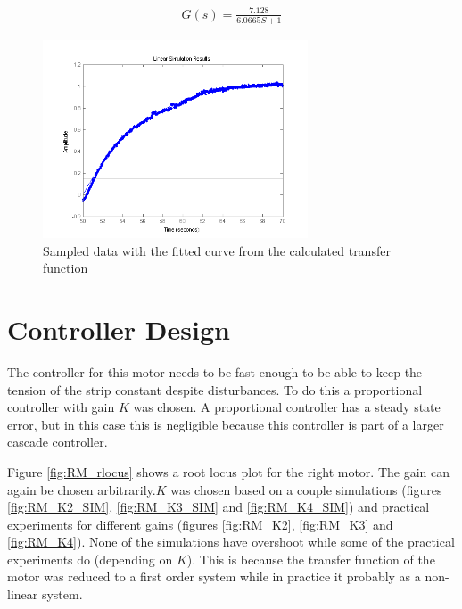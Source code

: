 \begin{align}
	G(s) = \frac{7.128}{6.0665S+1}
    \label{eq:RM_TF}
\end{align}

\begin{figure}[htbp]
\centering
\includegraphics[width = 0.7\textwidth]{pics/RM_systemID.png}
\caption{Sampled data with the fitted curve from the calculated transfer function}
\label{fig:RM_id}
\end{figure}

\FloatBarrier
\section{Controller Design}
The controller for this motor needs to be fast enough to be able to keep the tension of the strip constant despite disturbances. To do this a proportional controller with gain $K$ was chosen. A proportional controller has a steady state error, but in this case this is negligible because this controller is part of a larger cascade controller.

Figure \ref{fig:RM_rlocus} shows a root locus plot for the right motor. The gain can again be chosen arbitrarily.$K$ was chosen based on a couple simulations (figures \ref{fig:RM_K2_SIM}, \ref{fig:RM_K3_SIM} and \ref{fig:RM_K4_SIM}) and  practical experiments for different gains (figures \ref{fig:RM_K2}, \ref{fig:RM_K3} and \ref{fig:RM_K4}). None of the simulations have overshoot while some of the practical experiments do (depending on $K$). This is because the transfer function of the motor was reduced to a first order system while in practice it probably as a non-linear system.

